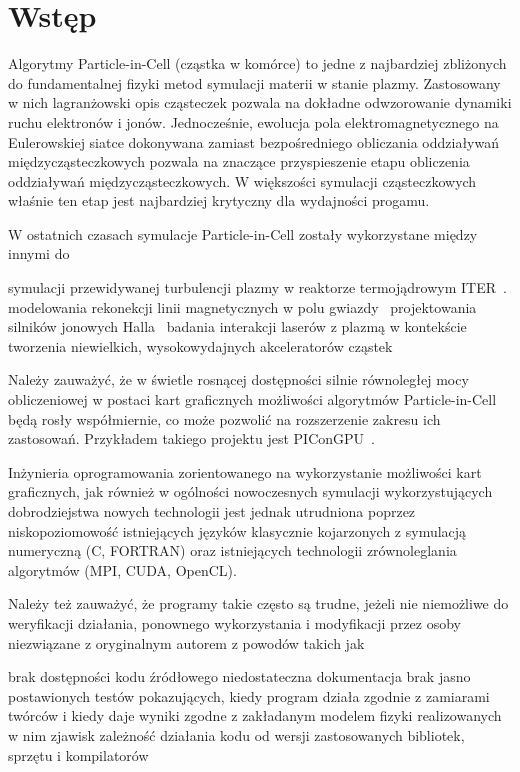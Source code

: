 \section[Wstęp]{Wstęp} %
Algorytmy Particle-in-Cell (cząstka w komórce) to jedne z najbardziej
zbliżonych do fundamentalnej fizyki metod symulacji materii w stanie plazmy.
Zastosowany w nich lagranżowski opis cząsteczek pozwala na dokładne
odwzorowanie dynamiki ruchu elektronów i jonów. Jednocześnie, ewolucja pola
elektromagnetycznego na Eulerowskiej siatce dokonywana zamiast bezpośredniego
obliczania oddziaływań międzycząsteczkowych pozwala na znaczące przyspieszenie
etapu obliczenia oddziaływań międzycząsteczkowych. W większości symulacji
cząsteczkowych właśnie ten etap jest najbardziej krytyczny dla wydajności
progamu.

W ostatnich czasach symulacje Particle-in-Cell zostały wykorzystane między innymi do
\begin{itemize}
\itemi{} symulacji przewidywanej turbulencji plazmy w reaktorze termojądrowym ITER~\cite{pic-hammett}.
\itemi{} modelowania rekonekcji linii magnetycznych w polu gwiazdy~\cite{pic-reconnection}
\itemi{} projektowania silników jonowych Halla~\cite{pic-hallengine}
\itemi{} badania interakcji laserów z plazmą w kontekście tworzenia niewielkich,
    wysokowydajnych akceleratorów cząstek~\cite{pic-laserplasma}
\end{itemize}

Należy zauważyć, że w świetle rosnącej dostępności silnie równoległej mocy
obliczeniowej w postaci kart graficznych możliwości algorytmów Particle-in-Cell
będą rosły współmiernie, co może pozwolić na rozszerzenie zakresu ich
zastosowań. Przykładem takiego projektu jest PIConGPU~\cite{picongpu}.

Inżynieria oprogramowania zorientowanego na wykorzystanie możliwości kart
graficznych, jak również w ogólności nowoczesnych symulacji wykorzystujących
dobrodziejstwa nowych technologii jest jednak utrudniona poprzez
niskopoziomowość istniejących języków klasycznie kojarzonych z symulacją
numeryczną (C, FORTRAN) oraz istniejących technologii zrównoleglania algorytmów
(MPI, CUDA, OpenCL).

Należy też zauważyć, że programy takie często są
trudne, jeżeli nie niemożliwe do weryfikacji działania, ponownego wykorzystania
i modyfikacji przez osoby niezwiązane z oryginalnym autorem z powodów takich jak
\begin{itemize}
    \itemi{} brak dostępności kodu źródłowego
    \itemi{} niedostateczna dokumentacja
    \itemi{} brak jasno postawionych testów pokazujących, kiedy program działa
    zgodnie z zamiarami twórców i kiedy daje wyniki zgodne z zakładanym
    modelem fizyki realizowanych w nim zjawisk
    \itemi{} zależność działania kodu od wersji zastosowanych bibliotek, sprzętu i kompilatorów
\end{itemize}

